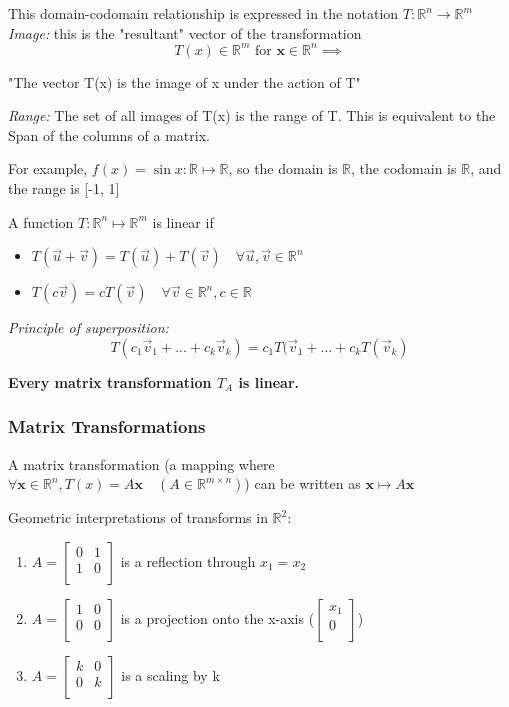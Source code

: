 \documentclass[12pt]{article} %
\newcommand{\R}{\mathbb{R}}
\begin{document}
This domain-codomain relationship is expressed in the notation $T: \R^n \to \R^m$\\

\emph{Image:} this is the "resultant" vector of the transformation 
$$T(x)\in \R^m \text{ for } \mathbf{x}\in \R^n \implies$$
\begin{center}
 "The vector T(x) is the image of x under the action of T"
\end{center}

\emph{Range:} The set of all images of T(x) is the range of T. This is equivalent to the Span of the columns of a matrix.

For example, $f(x) = \sin x : \R \mapsto \R$, so the domain is $\R$, the codomain is $\R$, and the range is [-1, 1]

A function $T : \R^n \mapsto \R^m$ is linear if
\begin{itemize}
	\item $T(\vec{u} + \vec{v}) = T(\vec{u}) + T(\vec{v}) \quad \forall \vec{u}, \vec{v} \in \R^n$
	\item $T(c\vec{v}) = cT(\vec{v}) \quad \forall \vec{v} \in \R^n, c \in \R$
\end{itemize}

\emph{Principle of superposition:}
$$T(c_1 \vec{v}_1 + ... + c_k \vec{v}_k) = c_1 T(\vec{v}_1 + ... + c_k T(\vec{v}_k)$$

\textbf{Every matrix transformation $T_A$ is linear.}

\subsubsection{Matrix Transformations}
A matrix transformation (a mapping where $\forall \mathbf{x} \in \R^n, T(x) =  A\mathbf{x} \quad (A \in \R^{m \times n})$) can be written as $\mathbf{x} \mapsto A\mathbf{x}$

Geometric interpretations of transforms in $\R^2$:
\begin{enumerate}
	\item $A = \begin{bmatrix}
		0 & 1\\1 & 0\\	
		\end{bmatrix}$ is a reflection through $x_1 = x_2$
	
	\item $A = \begin{bmatrix}
		1 & 0\\0 & 0\\	
	\end{bmatrix}$ is a projection onto the x-axis ($\begin{bmatrix}
		x_1\\ 0\\
	\end{bmatrix}$)

	\item $A = \begin{bmatrix}
		k & 0\\0 & k\\	
	\end{bmatrix}$ is a scaling by k 
\end{enumerate}
\end{document}
